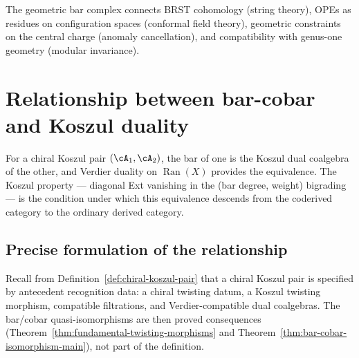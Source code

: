 \begin{remark}
The geometric bar complex connects BRST cohomology (string theory), OPEs as residues on configuration spaces (conformal field theory), geometric constraints on the central charge (anomaly cancellation), and compatibility with genus-one geometry (modular invariance).
\end{remark}

\section{Relationship between bar-cobar and Koszul duality}

For a chiral Koszul pair $(\cA_1, \cA_2)$, the bar of one is the
Koszul dual coalgebra of the other, and Verdier duality on
$\operatorname{Ran}(X)$ provides the equivalence.  The Koszul
property --- diagonal Ext vanishing in the (bar degree, weight)
bigrading --- is the condition under which this equivalence descends
from the coderived category to the ordinary derived category.

\subsection{Precise formulation of the relationship}

\begin{remark}\label{rem:koszul-criteria}
\label{rem:koszul-chiral}
Recall from Definition~\ref{def:chiral-koszul-pair} that a chiral Koszul pair
is specified by antecedent recognition data: a chiral twisting datum, a Koszul
twisting morphism, compatible filtrations, and Verdier-compatible dual coalgebras.
The bar/cobar quasi-isomorphisms are then proved consequences
(Theorem~\ref{thm:fundamental-twisting-morphisms} and
Theorem~\ref{thm:bar-cobar-isomorphism-main}), not part of the definition.
\end{remark}

